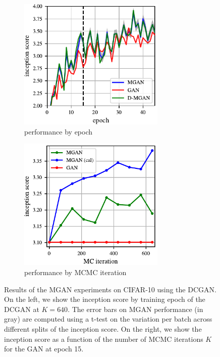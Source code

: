 \documentclass{article}
\begin{document}
\begin{figure}
    \centering
    \begin{subfigure}[b]{0.49\textwidth}
       \centering
       \includegraphics[width=2.75in]{figures/base_iso.pdf}
       \caption{performance by epoch}
       \label{fig:incep_by_epoch}
    \end{subfigure}
    \begin{subfigure}[b]{0.49\textwidth}
       \centering
       \includegraphics[width=2.75in]{figures/plot_per_mh.pdf}
       \caption{performance by MCMC iteration}
       \label{fig:incep_by_iter}
    \end{subfigure}
    \caption{{\small
    Results of the MGAN experiments on CIFAR-10 using the DCGAN\@.
    On the left, we show the inception score by training epoch of the DCGAN at $K=640$.
    The error bars on MGAN performance (in gray) are computed using a t-test on the variation per batch across different splits of the inception score.
    On the right, we show the inception score as a function of the number of MCMC iterations $K$ for the GAN at epoch 15.
    }}
\end{figure}

\end{document}
